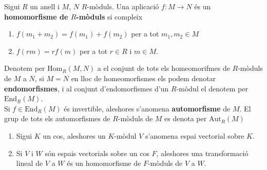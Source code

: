 \begin{definition}
Sigui $R$ un anell i $M$, $N$ $R$-mòduls. Una aplicació $f: M\rightarrow N$ és un \textbf{homomorfisme de $R$-mòduls} si compleix
\begin{enumerate}[(1)]
\item $f(m_1+m_2)=f(m_1)+f(m_2)$ per a tot $m_1,m_2\in M$ 
\item  $f(rm)=rf(m)$ per a tot $r\in R$ i $m\in M$.
\end{enumerate}

Denotem per $\text{Hom}_R(M,N)$ a el conjunt de tots els homeomorifmes de $R$-mòduls de $M$ a $N$, si $M=N$ en lloc de homeomorfismes els podem denotar \textbf{endomorfismes}, i al conjunt d'endomorfismes d'un $R$-mòdul el denotem per $\text{End}_R(M)$. \\
Si $f\in \text{End}_R(M)$ és invertible, aleshores s'anomena \textbf{automorfisme }de $M$. El grup de tots els automorfismes  de $R$-mòduls de $M$ es denota per $\text{Aut}_R(M)$ 
\end{definition}

\begin{definition}
\begin{enumerate}[(1)]
\item Sigui $K$ un cos, aleshores un $K$-mòdul $V$ s'anomena espai vectorial sobre $K$.
\item Si $V$ i $W$ són espais vectorials sobre un cos $F$, aleshores una transformació lineal de $V$ a $W$ és un homomorfisme de $F$-mòduls de $V$ a $W$.
\end{enumerate}
\end{definition}

